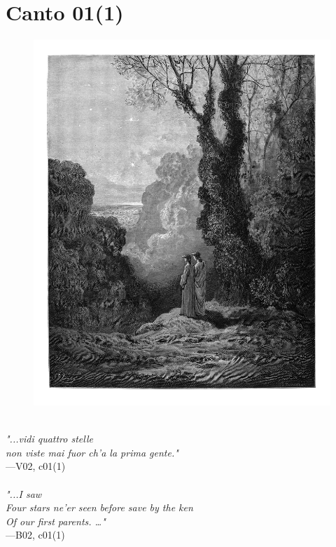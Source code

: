 \documentclass[../Dore_vision.tex]{subfiles}
\begin{document}
\section{Canto 01(1)}

\begin{figure}[ht]
\centering
\includegraphics[height=\figsize]{illustrations/book_2/V02, c01(1).jpg}
\end{figure}

\begin{center}
\begin{minipage}{0.8\linewidth}
\textit{\\
"...vidi quattro stelle\\non viste mai fuor ch’a la prima gente."} \\
—V02, c01(1) \\~\\
\textit{"...I saw\\Four stars ne'er seen before save by the ken\\Of our first parents. …"} \\
—B02, c01(1)
\end{minipage}
\end{center}
\end{document}
